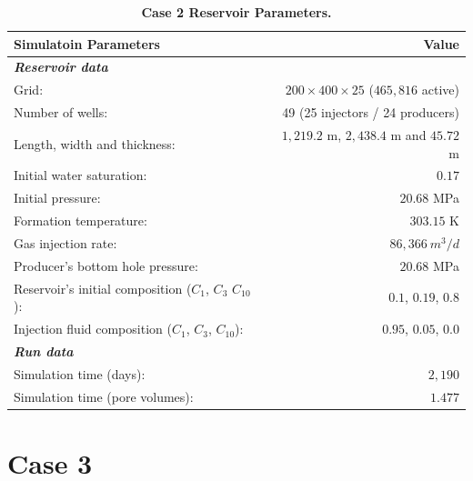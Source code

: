 \FloatBarrier
\begin{center}
\begin{table}[h!]
\begin{adjustbox}{width=0.8\textwidth}
    \begin{threeparttable}
    \caption{\textbf{Case 2 Reservoir Parameters\supercite{fernandes}.}}
    \label{case1}
        \begin{tabular}{l r }
            \toprule
            Simulatoin Parameters & Value\\
            \midrule
	\rowcolor{red!20}\textit{\textbf{Reservoir data}}      & \\
	Grid:      &           $200\times400\times25$ ($465,816$ active) \\
	\rowcolor{blue!5}Number of wells:      &  49 (25 injectors / 24 producers) \\
	Length, width and thickness:      & $1,219.2$ m, $2,438.4$ m and $45.72$ m\\
	Initial water saturation:    & $0.17$ \\      
	\rowcolor{blue!5}Initial pressure:    &      $20.68$ MPa\\
	Formation temperature:    & $303.15$ K     \\
	Gas injection rate:    &       $86,366 \ m^{3}/d$ \\
	\rowcolor{blue!5}Producer’s bottom hole pressure:    &       $20.68$ MPa\\
	Reservoir’s initial composition ($C_{1}$, $C_{3}$ $C_{10}$): & $0.1$, $0.19$, $0.8$\\
	\rowcolor{blue!5}Injection ﬂuid composition ($C_{1}$, $C_{3}$, $C_{10}$):    &   $0.95$, $0.05$, $0.0$\\
	\rowcolor{red!20}\textit{\textbf{Run data}}    &       \\
	Simulation time (days):    &  $2,190$\\
	\rowcolor{blue!5}Simulation time (pore volumes):    & $1.477$\\
            \bottomrule
        \end{tabular}
    \end{threeparttable}
\end{adjustbox}    
\end{table}
\end{center}
\FloatBarrier

\section{Case 3}

